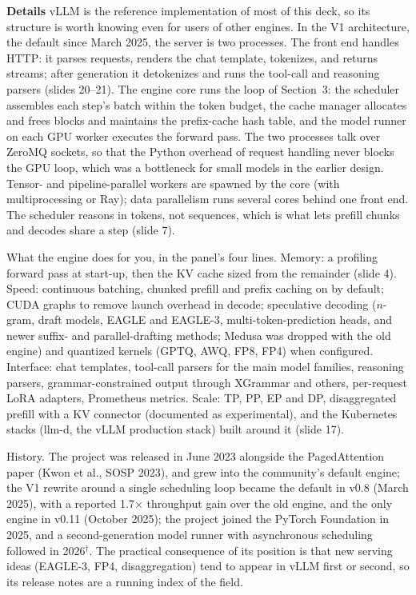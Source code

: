 \documentclass[11pt,letterpaper]{article}
\newcommand{\para}[1]{\medskip\noindent\textbf{#1}\quad}
\begin{document}
\para{Details} vLLM is the reference implementation of most of this deck, so its structure is worth knowing even for users of other engines. In the V1 architecture, the default since March 2025, the server is two processes. The front end handles HTTP: it parses requests, renders the chat template, tokenizes, and returns streams; after generation it detokenizes and runs the tool-call and reasoning parsers (slides 20--21). The engine core runs the loop of Section~3: the scheduler assembles each step's batch within the token budget, the cache manager allocates and frees blocks and maintains the prefix-cache hash table, and the model runner on each GPU worker executes the forward pass. The two processes talk over ZeroMQ sockets, so that the Python overhead of request handling never blocks the GPU loop, which was a bottleneck for small models in the earlier design. Tensor- and pipeline-parallel workers are spawned by the core (with multiprocessing or Ray); data parallelism runs several cores behind one front end. The scheduler reasons in tokens, not sequences, which is what lets prefill chunks and decodes share a step (slide 7).

What the engine does for you, in the panel's four lines. Memory: a profiling forward pass at start-up, then the KV cache sized from the remainder (slide 4). Speed: continuous batching, chunked prefill and prefix caching on by default; CUDA graphs to remove launch overhead in decode; speculative decoding ($n$-gram, draft models, EAGLE and EAGLE-3, multi-token-prediction heads, and newer suffix- and parallel-drafting methods; Medusa was dropped with the old engine) and quantized kernels (GPTQ, AWQ, FP8, FP4) when configured. Interface: chat templates, tool-call parsers for the main model families, reasoning parsers, grammar-constrained output through XGrammar and others, per-request LoRA adapters, Prometheus metrics. Scale: TP, PP, EP and DP, disaggregated prefill with a KV connector (documented as experimental), and the Kubernetes stacks (llm-d, the vLLM production stack) built around it (slide 17).

History. The project was released in June 2023 alongside the PagedAttention paper (Kwon et al., SOSP 2023), and grew into the community's default engine; the V1 rewrite around a single scheduling loop became the default in v0.8 (March 2025), with a reported 1.7$\times$ throughput gain over the old engine, and the only engine in v0.11 (October 2025); the project joined the PyTorch Foundation in 2025, and a second-generation model runner with asynchronous scheduling followed in 2026$^\dagger$. The practical consequence of its position is that new serving ideas (EAGLE-3, FP4, disaggregation) tend to appear in vLLM first or second, so its release notes are a running index of the field.
\end{document}
